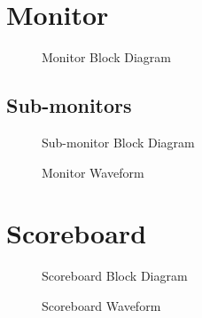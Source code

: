 \section{Monitor}
\begin{figure}[H]
  \centering
  
  \caption{Monitor Block Diagram}
  \label{MonitorBlk}
\end{figure}

\subsection{Sub-monitors}

\begin{figure}[H]
  \centering
  
  \caption{Sub-monitor Block Diagram}
  \label{SubmonBlk}
\end{figure}

\begin{figure}[H]
  \centering
  
  \caption{Monitor Waveform}
  \label{MonitorWave}
\end{figure}

\section{Scoreboard}

\begin{figure}[H]
  \centering
  
  \caption{Scoreboard Block Diagram}
  \label{ScoreboardBlk}
\end{figure}

\begin{figure}[H]
  \centering
  
  \caption{Scoreboard Waveform}
  \label{ScoreboardWave}
\end{figure}
